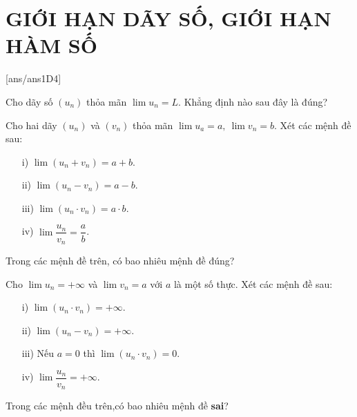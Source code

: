 \section{GIỚI HẠN DÃY SỐ, GIỚI HẠN HÀM SỐ}
[ans/ans1D4]
\begin{ex}%
	Cho dãy số $(u_n)$ thỏa mãn $\lim\limits u_n=L$. Khẳng định nào sau đây là đúng?
\end{ex}
\begin{ex}%
	Cho hai dãy $(u_n)$ và $(v_n)$ thỏa mãn $\lim\limits u_a=a,\ \lim\limits v_n=b.$ Xét các mệnh đề sau:
	\begin{enumerate}
		\item[i)] $\lim\limits(u_n+v_n)=a+b$.
		\item[ii)] $\lim\limits(u_n-v_n)=a-b$.
		\item[iii)] $\lim\limits (u_n \cdot v_n)=a\cdot b$.
		\item[iv)] $\lim\limits \dfrac{u_n}{v_n}=\dfrac{a}{b}$.
	\end{enumerate}
	Trong các mệnh đề trên, có bao nhiêu mệnh đề đúng?
\end{ex}
\begin{ex}%
	Cho $\lim\limits u_n=+\infty$ và $\lim\limits v_n=a$ với $a$ là một số thực. Xét các mệnh đề sau:
	\begin{enumerate}
		\item[i)] $\lim\limits(u_n\cdot v_n)=+\infty $.
		\item[ii)] $\lim\limits(u_n-v_n)=+\infty$.
		\item[iii)]Nếu $a=0$ thì $\lim\limits (u_n \cdot v_n)=0$.
		\item[iv)] $\lim\limits \dfrac{u_n}{v_n}=+\infty$.
	\end{enumerate}
	Trong các mệnh đều trên,có bao nhiêu mệnh đề \textbf{sai}?
\end{ex}
